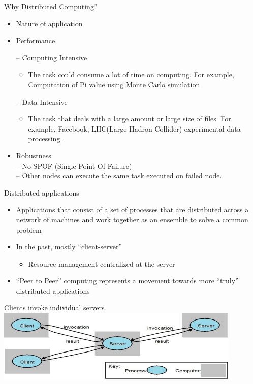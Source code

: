 \documentclass{SKP-beamer}
\begin{document}
\begin{frame}{Why Distributed Computing?}
	\begin{itemize}
		\item Nature of application
		\item Performance
		
	
         	-- Computing Intensive
		\begin{itemize}
		\item The task could consume a lot of time on computing. For 
		example, Computation of Pi value using Monte Carlo simulation
	\end{itemize}
	       -- Data Intensive
	       \begin{itemize}
	       	\item The task that deals with a large amount or large size of files. For 
	       	example, Facebook, LHC(Large Hadron Collider) experimental data 
	       	processing.
	       \end{itemize}
	     \item Robustness \\
	       -- No SPOF (Single Point Of Failure)\\
	       -- Other nodes can execute the same task executed on failed 
	       node.
	       
    \end{itemize}
\end{frame}

\begin{frame}{Distributed applications}
	\begin{itemize}
		\item Applications that consist of a set of processes that are distributed across a 
		network of machines and work together as an ensemble to solve a 
		common problem
		\item In the past, mostly “client-server”
		\begin{itemize}
			\item Resource management centralized at the server
		\end{itemize}
		
		\item “Peer to Peer” computing represents a movement towards more “truly”
		distributed applications
		
		
		
	\end{itemize}
\end{frame}

\begin{frame}{Clients invoke individual servers}
	\includegraphics[scale=1.2]{3.png}
\end{frame}
\end{document}
